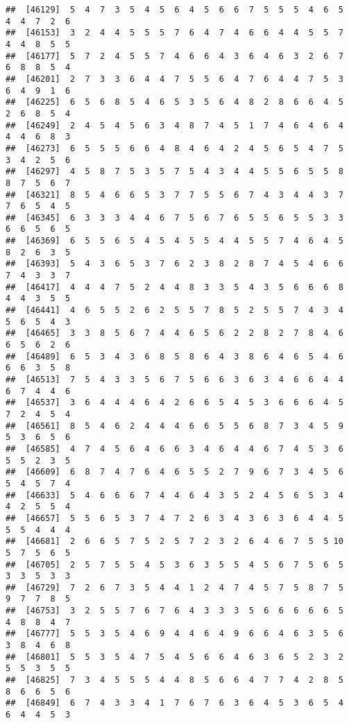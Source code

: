 \documentclass[
]{book}
\begin{document}
\begin{verbatim}
##  [46129]  5  4  7  3  5  4  5  6  4  5  6  6  7  5  5  5  4  6  5  4  4  7  2  6
##  [46153]  3  2  4  4  5  5  5  7  6  4  7  4  6  6  4  4  5  5  7  4  4  8  5  5
##  [46177]  5  7  2  4  5  5  7  4  6  6  4  3  6  4  6  3  2  6  7  6  8  8  5  4
##  [46201]  2  7  3  3  6  4  4  7  5  5  6  4  7  6  4  4  7  5  3  6  4  9  1  6
##  [46225]  6  5  6  8  5  4  6  5  3  5  6  4  8  2  8  6  6  4  5  2  6  8  5  4
##  [46249]  2  4  5  4  5  6  3  4  8  7  4  5  1  7  4  6  4  6  4  4  4  6  8  3
##  [46273]  6  5  5  5  6  6  4  8  4  6  4  2  4  5  6  5  4  7  5  3  4  2  5  6
##  [46297]  4  5  8  7  5  3  5  7  5  4  3  4  4  5  5  6  5  5  8  8  7  5  6  7
##  [46321]  8  5  4  6  6  5  3  7  7  5  5  6  7  4  3  4  4  3  7  7  6  5  4  5
##  [46345]  6  3  3  3  4  4  6  7  5  6  7  6  5  5  6  5  5  3  3  6  6  5  6  5
##  [46369]  6  5  5  6  5  4  5  4  5  5  4  4  5  5  7  4  6  4  5  8  2  6  3  5
##  [46393]  5  4  3  6  5  3  7  6  2  3  8  2  8  7  4  5  4  6  6  7  4  3  3  7
##  [46417]  4  4  4  7  5  2  4  4  8  3  3  5  4  3  5  6  6  6  8  4  4  3  5  5
##  [46441]  4  6  5  5  2  6  2  5  5  7  8  5  2  5  5  7  4  3  4  5  6  5  4  3
##  [46465]  3  3  8  5  6  7  4  4  6  5  6  2  2  8  2  7  8  4  6  6  5  6  2  6
##  [46489]  6  5  3  4  3  6  8  5  8  6  4  3  8  6  4  6  5  4  6  6  6  3  5  8
##  [46513]  7  5  4  3  3  5  6  7  5  6  6  3  6  3  4  6  6  4  4  6  7  4  4  6
##  [46537]  3  6  4  4  4  6  4  2  6  6  5  4  5  3  6  6  6  4  5  7  2  4  5  4
##  [46561]  8  5  4  6  2  4  4  4  6  6  5  5  6  8  7  3  4  5  9  5  3  6  5  6
##  [46585]  4  7  4  5  6  4  6  6  3  4  6  4  4  6  7  4  5  3  6  5  5  2  3  5
##  [46609]  6  8  7  4  7  6  4  6  5  5  2  7  9  6  7  3  4  5  6  5  4  5  7  4
##  [46633]  5  4  6  6  6  7  4  4  6  4  3  5  2  4  5  6  5  3  4  4  2  5  5  4
##  [46657]  5  5  6  5  3  7  4  7  2  6  3  4  3  6  3  6  4  4  5  5  5  4  4  4
##  [46681]  2  6  6  5  7  5  2  5  7  2  3  2  6  4  6  7  5  5 10  5  7  5  6  5
##  [46705]  2  5  7  5  5  4  5  3  6  3  5  5  4  5  6  7  5  6  5  3  3  5  3  3
##  [46729]  7  2  6  7  3  5  4  4  1  2  4  7  4  5  7  5  8  7  5  9  7  7  8  5
##  [46753]  3  2  5  5  7  6  7  6  4  3  3  3  5  6  6  6  6  6  5  4  8  8  4  7
##  [46777]  5  5  3  5  4  6  9  4  4  6  4  9  6  6  4  6  3  5  6  3  8  4  6  8
##  [46801]  5  5  3  5  4  7  5  4  5  6  6  4  6  3  6  5  2  3  2  5  5  3  5  5
##  [46825]  7  3  4  5  5  5  4  4  8  5  6  6  4  7  7  4  2  8  5  8  6  6  5  6
##  [46849]  6  7  4  3  3  4  1  7  6  7  6  3  6  4  5  3  6  5  4  6  4  4  5  3

\end{verbatim}
\end{document}

